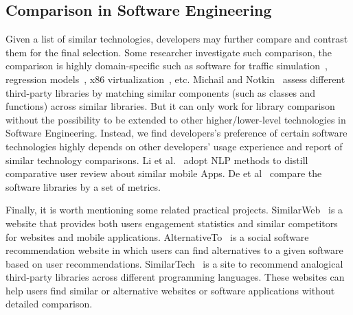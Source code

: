 \subsection{Comparison in Software Engineering}
Given a list of similar technologies, developers may further compare and contrast them for the final selection.
Some researcher investigate such comparison, the comparison is highly domain-specific such as software for traffic simulation~\cite{jones2004traffic}, regression models~\cite{horton2001multiple}, x86 virtualization~\cite{adams2006comparison}, etc.
Michail and Notkin~\cite{michail1999assessing} assess different third-party libraries by matching similar components (such as classes and functions) across similar libraries.
But it can only work for library comparison without the possibility to be extended to other higher/lower-level technologies in Software Engineering.
Instead, we find developers's preference of certain software technologies highly depends on other developers' usage experience and report of similar technology comparisons.
Li et al.~\cite{li2017mining} adopt NLP methods to distill comparative user review about similar mobile Apps.
De et al~\cite{de2018library, de2018empirical} compare the software libraries by a set of metrics.

Finally, it is worth mentioning some related practical projects. 
SimilarWeb~\cite{web:similarweb} is a website that provides both users engagement statistics and similar competitors for websites and mobile applications. 
AlternativeTo~\cite{web:alternativeto} is a social software recommendation website in which users can find alternatives to a given software based on user recommendations. 
SimilarTech~\cite{web:similartechgraph} is a site to recommend analogical third-party libraries across different programming languages.
These websites can help users find similar or alternative websites or software applications without detailed comparison.  